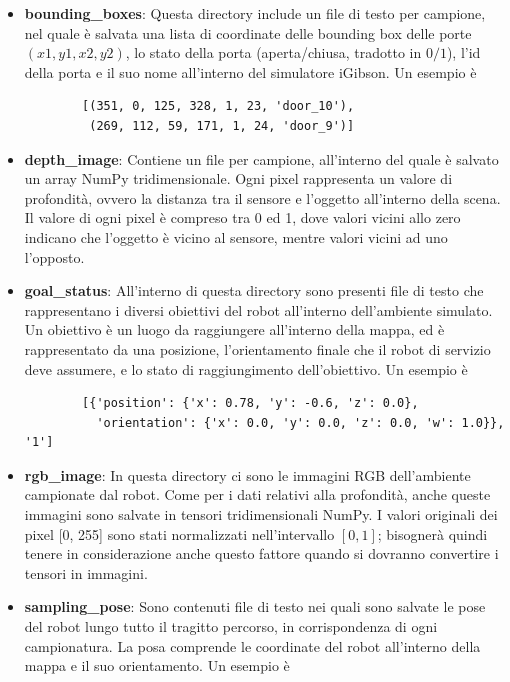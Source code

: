 \documentclass[12pt]{report}
\begin{document}
\begin{itemize}
	\item \textbf{bounding\_boxes}: Questa directory include un file di testo per campione, nel quale è salvata una lista di coordinate delle bounding box delle porte $(x1, y1, x2, y2)$, lo stato della porta (aperta/chiusa, tradotto in $0/1$), l'id della porta e il suo nome all'interno del simulatore iGibson. Un esempio è
	
	\begin{verbatim}
		[(351, 0, 125, 328, 1, 23, 'door_10'),
		 (269, 112, 59, 171, 1, 24, 'door_9')]
	\end{verbatim}
	
	\item \textbf{depth\_image}: Contiene un file per campione, all'interno del quale è salvato un array NumPy tridimensionale. Ogni pixel rappresenta un valore di profondità, ovvero la distanza tra il sensore e l'oggetto all'interno della scena. Il valore di ogni pixel è compreso tra 0 ed 1, dove valori vicini allo zero indicano che l'oggetto è vicino al sensore, mentre valori vicini ad uno l'opposto.
	
	\item \textbf{goal\_status}: All'interno di questa directory sono presenti file di testo che rappresentano i diversi obiettivi del robot all'interno dell'ambiente simulato. Un obiettivo è un luogo da raggiungere all'interno della mappa, ed è rappresentato da una posizione, l'orientamento finale che il robot di servizio deve assumere, e lo stato di raggiungimento dell'obiettivo. Un esempio è
	
	\begin{verbatim}
		[{'position': {'x': 0.78, 'y': -0.6, 'z': 0.0},
		  'orientation': {'x': 0.0, 'y': 0.0, 'z': 0.0, 'w': 1.0}}, '1']
	\end{verbatim}
	
	\item \textbf{rgb\_image}: In questa directory ci sono le immagini RGB dell'ambiente campionate dal robot. Come per i dati relativi alla profondità, anche queste immagini sono salvate in tensori tridimensionali NumPy. I valori originali dei pixel [0, 255] sono stati normalizzati nell'intervallo $[0, 1]$; bisognerà quindi tenere in considerazione anche questo fattore quando si dovranno convertire i tensori in immagini.
	
	\item \textbf{sampling\_pose}: Sono contenuti file di testo nei quali sono salvate le pose del robot lungo tutto il tragitto percorso, in corrispondenza di ogni campionatura. La posa comprende le coordinate del robot all'interno della mappa e il suo orientamento. Un esempio è
	

\end{itemize}
\end{document}

